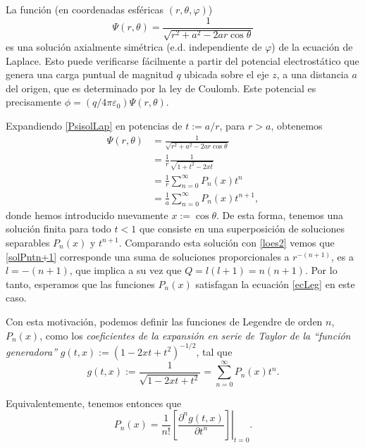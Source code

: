 La función (en coordenadas esféricas $(r,\theta,\varphi)$)
\begin{equation}\label{PsisolLap}
\Psi(r,\theta)=\frac{1}{\sqrt{r^2+a^2-2ar\cos\theta}}
\end{equation}
es una solución axialmente simétrica (e.d. independiente de $\varphi$) de la ecuación de Laplace. Esto puede verificarse fácilmente a partir del potencial electrostático que genera una carga puntual de magnitud $q$ ubicada sobre el eje $z$, a una distancia $a$ del origen, que es determinado por la ley de Coulomb. Este potencial es precisamente $\phi=(q/4\pi\varepsilon_0)\Psi(r,\theta)$.

Expandiendo \eqref{PsisolLap} en potencias de $t:=a/r$, para $r>a$, obtenemos
\begin{align}
\Psi(r,\theta) &= \frac{1}{\sqrt{r^2+a^2-2ar\cos\theta}} \\
&= \frac{1}{r}\frac{1}{\sqrt{1+t^2-2xt}} \\
&= \frac{1}{r}\sum_{n=0}^\infty P_n(x)t^n \\
&= \frac{1}{a}\sum_{n=0}^\infty P_n(x)t^{n+1}, \label{solPntn+1}
\end{align}
donde hemos introducido nuevamente $x:=\cos\theta$. De esta forma, tenemos una solución finita para todo $t<1$ que consiste en una superposición de soluciones separables $P_n(x)$ y $t^{n+1}$. Comparando esta solución con \eqref{loes2} vemos que \eqref{solPntn+1} corresponde una suma de soluciones proporcionales a $r^{-(n+1)}$, es a $l=-(n+1)$, que implica a su vez que $Q=l(l+1)=n(n+1)$. Por lo tanto, esperamos que las funciones $P_n(x)$ satisfagan la ecuación \eqref{ecLeg} en este caso.  

\begin{tcolorbox}
Con esta motivación, podemos definir las funciones de Legendre de orden $n$, $P_n(x)$, como los \textit{coeficientes de la expansión en serie de Taylor de la ``función generadora''}  $g(t,x):=(1-2xt+t^2)^{-1/2}$, tal que
\begin{equation}
g(t,x):=\frac{1}{\sqrt{1-2xt+t^2}}=\sum_{n=0}^{\infty}P_{n}(x)t^{n}.
\end{equation}
\end{tcolorbox}
Equivalentemente, tenemos entonces que
\begin{equation}
P_n(x)=\frac{1}{n!}\left.\left[\frac{\partial^ng(t,x)}{\partial t^n}\right]\right|_{t=0}.
\end{equation}


 
